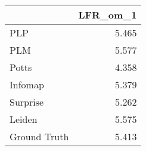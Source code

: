 \begin{tabular}{lr}
\toprule
{} & LFR_om_1 \\
\midrule
PLP          &    5.465 \\
PLM          &    5.577 \\
Potts        &    4.358 \\
Infomap      &    5.379 \\
Surprise     &    5.262 \\
Leiden       &    5.575 \\
Ground Truth &    5.413 \\
\bottomrule
\end{tabular}
